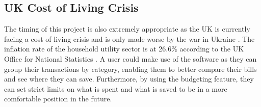 \subsection{UK Cost of Living Crisis}
The timing of this project is also extremely appropriate as the UK is currently facing a cost of living crisis and is only made worse by the war in Ukraine \cite{CostOfLivingCrisisArticle}. The inflation rate of the household utility sector is at 26.6\% according to the UK Office for National Statistics \cite{CPISectorStats}. A user could make use of the software as they can group their transactions by category, enabling them to better compare their bills and see where they can save. Furthermore, by using the budgeting feature, they can set strict limits on what is spent and what is saved to be in a more comfortable position in the future.


